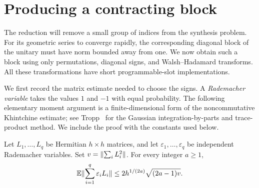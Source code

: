 \section{Producing a contracting block}\label{sec:contraction}

The reduction will remove a small group of indices from the synthesis problem.
For its geometric series to converge rapidly, the corresponding diagonal block
of the unitary must have norm bounded away from one.  We now obtain such a block
using only permutations, diagonal signs, and Walsh--Hadamard transforms.  All
these transformations have short programmable-slot implementations.

We first record the matrix estimate needed to choose the signs.  A
\emph{Rademacher variable} takes the values $1$ and $-1$ with equal probability.
The following elementary moment argument is a finite-dimensional form of the
noncommutative Khintchine estimate; see Tropp~\cite[Sections~6--7]{Tropp2018}
for the Gaussian integration-by-parts and trace-product method.  We include
the proof with the constants used below.

\begin{lemma}\label{contract:moment}
Let $L_1,\ldots,L_q$ be Hermitian $h\times h$ matrices, and let
$\varepsilon_1,\ldots,\varepsilon_q$ be independent Rademacher variables.
Set $v=\lVert \sum_i L_i^2\rVert$.  For every integer $a\geq1$,
\begin{equation}\label{contract:sign-bound}
 \mathbb E\lVert \sum_{i=1}^q\varepsilon_iL_i\rVert
 \leq 2h^{1/(2a)}\sqrt{(2a-1)v}.
\end{equation}
\end{lemma}

